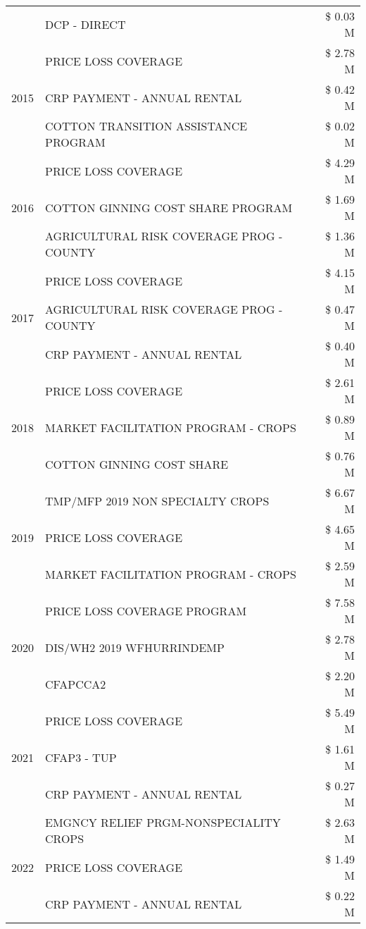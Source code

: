 \begin{tabular}{llr}
 & DCP - DIRECT & \$ 0.03 M \\
\cline{1-3}
\multirow[t]{3}{*}{2015} & PRICE LOSS COVERAGE & \$ 2.78 M \\
 & CRP PAYMENT - ANNUAL RENTAL & \$ 0.42 M \\
 & COTTON TRANSITION ASSISTANCE PROGRAM & \$ 0.02 M \\
\cline{1-3}
\multirow[t]{3}{*}{2016} & PRICE LOSS COVERAGE & \$ 4.29 M \\
 & COTTON GINNING COST SHARE PROGRAM & \$ 1.69 M \\
 & AGRICULTURAL RISK COVERAGE PROG - COUNTY & \$ 1.36 M \\
\cline{1-3}
\multirow[t]{3}{*}{2017} & PRICE LOSS COVERAGE & \$ 4.15 M \\
 & AGRICULTURAL RISK COVERAGE PROG - COUNTY & \$ 0.47 M \\
 & CRP PAYMENT - ANNUAL RENTAL & \$ 0.40 M \\
\cline{1-3}
\multirow[t]{3}{*}{2018} & PRICE LOSS COVERAGE & \$ 2.61 M \\
 & MARKET FACILITATION PROGRAM - CROPS & \$ 0.89 M \\
 & COTTON GINNING COST SHARE & \$ 0.76 M \\
\cline{1-3}
\multirow[t]{3}{*}{2019} & TMP/MFP 2019 NON SPECIALTY CROPS & \$ 6.67 M \\
 & PRICE LOSS COVERAGE & \$ 4.65 M \\
 & MARKET FACILITATION PROGRAM - CROPS & \$ 2.59 M \\
\cline{1-3}
\multirow[t]{3}{*}{2020} & PRICE LOSS COVERAGE PROGRAM & \$ 7.58 M \\
 & DIS/WH2 2019 WFHURRINDEMP & \$ 2.78 M \\
 & CFAPCCA2 & \$ 2.20 M \\
\cline{1-3}
\multirow[t]{3}{*}{2021} & PRICE LOSS COVERAGE & \$ 5.49 M \\
 & CFAP3 - TUP & \$ 1.61 M \\
 & CRP PAYMENT - ANNUAL RENTAL & \$ 0.27 M \\
\cline{1-3}
\multirow[t]{3}{*}{2022} & EMGNCY RELIEF PRGM-NONSPECIALITY CROPS & \$ 2.63 M \\
 & PRICE LOSS COVERAGE & \$ 1.49 M \\
 & CRP PAYMENT - ANNUAL RENTAL & \$ 0.22 M \\
\cline{1-3}
\bottomrule
\end{tabular}
